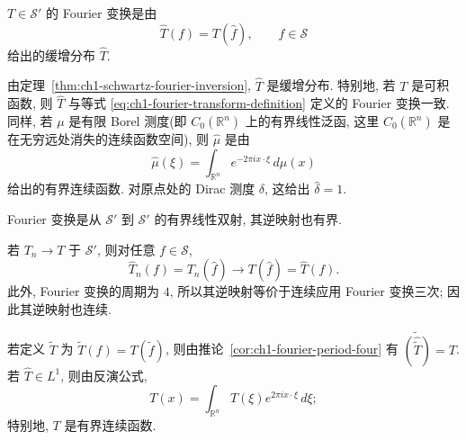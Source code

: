 \begin{Definition}
\label{def:ch1-tempered-distribution-fourier-transform}
$T\in\mathcal S'$ 的 Fourier 变换是由
\[
 \widehat T(f)=T(\widehat f),\qquad f\in\mathcal S
\]
给出的缓增分布 $\widehat T$.
\end{Definition}

由定理~\ref{thm:ch1-schwartz-fourier-inversion}, $\widehat T$ 是缓增分布. 特别地, 若 $T$ 是可积函数, 则 $\widehat T$ 与等式 \eqref{eq:ch1-fourier-transform-definition} 定义的 Fourier 变换一致. 同样, 若 $\mu$ 是有限 Borel 测度(即 $C_0(\mathbb R^n)$ 上的有界线性泛函, 这里 $C_0(\mathbb R^n)$ 是在无穷远处消失的连续函数空间), 则 $\widehat\mu$ 是由
\[
 \widehat\mu(\xi)=\int_{\mathbb R^n}e^{-2\pi ix\cdot\xi}\,d\mu(x)
\]
给出的有界连续函数. 对原点处的 Dirac 测度 $\delta$, 这给出 $\widehat\delta=1$.

\hypertarget{chapter-01-page-027}{}
\begin{Theorem}
\label{thm:ch1-fourier-isomorphism-sprime}
Fourier 变换是从 $\mathcal S'$ 到 $\mathcal S'$ 的有界线性双射, 其逆映射也有界.
\end{Theorem}

\begin{Proof}
若 $T_n\to T$ 于 $\mathcal S'$, 则对任意 $f\in\mathcal S$,
\[
 \widehat T_n(f)=T_n(\widehat f)\longrightarrow T(\widehat f)=\widehat T(f).
\]
此外, Fourier 变换的周期为 $4$, 所以其逆映射等价于连续应用 Fourier 变换三次; 因此其逆映射也连续.
\end{Proof}

若定义 $\widetilde T$ 为 $\widetilde T(f)=T(\widetilde f)$, 则由推论~\ref{cor:ch1-fourier-period-four} 有 $\widetilde{(\widehat{\widetilde T})}=T$. 若 $\widehat T\in L^1$, 则由反演公式,
\[
 T(x)=\int_{\mathbb R^n}\widehat T(\xi)e^{2\pi ix\cdot\xi}\,d\xi;
\]
特别地, $T$ 是有界连续函数.

